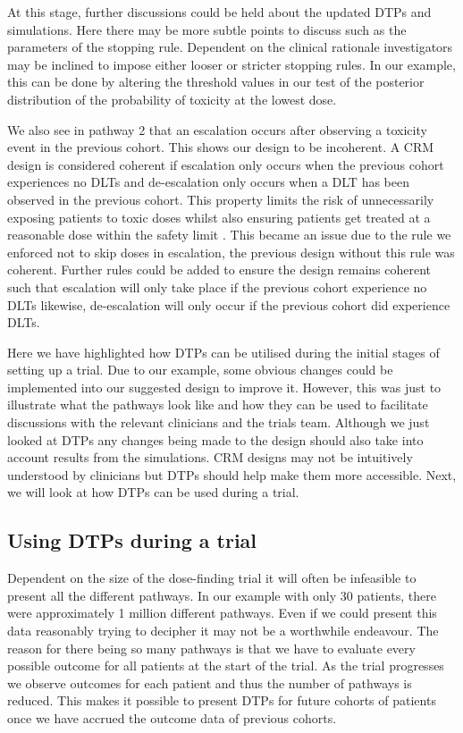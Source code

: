 At this stage, further discussions could be held about the updated DTPs and simulations. Here there may be more subtle points to discuss such as the parameters of the stopping rule. Dependent on the clinical rationale investigators may be inclined to impose either looser or stricter stopping rules. In our example, this can be done by altering the threshold values in our test of the posterior distribution of the probability of toxicity at the lowest dose. 

We also see in pathway 2 that an escalation occurs after observing a toxicity event in the previous cohort. This shows our design to be incoherent. A CRM design is considered coherent if escalation only occurs when the previous cohort experiences no DLTs and de-escalation only occurs when a DLT has been observed in the previous cohort. This property limits the risk of unnecessarily exposing patients to toxic doses whilst also ensuring patients get treated at a reasonable dose within the safety limit \cite{cheungDoseFindingContinual2011}. This became an issue due to the rule we enforced not to skip doses in escalation, the previous design without this rule was coherent. Further rules could be added to ensure the design remains coherent such that escalation will only take place if the previous cohort experience no DLTs likewise, de-escalation will only occur if the previous cohort did experience DLTs. 

Here we have highlighted how DTPs can be utilised during the initial stages of setting up a trial. Due to our example, some obvious changes could be implemented into our suggested design to improve it. However, this was just to illustrate what the pathways look like and how they can be used to facilitate discussions with the relevant clinicians and the trials team. Although we just looked at DTPs any changes being made to the design should also take into account results from the simulations. CRM designs may not be intuitively understood by clinicians but DTPs should help make them more accessible. Next, we will look at how DTPs can be used during a trial.  

\subsection{Using DTPs during a trial}

Dependent on the size of the dose-finding trial it will often be infeasible to present all the different pathways. In our example with only 30 patients, there were approximately 1 million different pathways. Even if we could present this data reasonably trying to decipher it may not be a worthwhile endeavour. The reason for there being so many pathways is that we have to evaluate every possible outcome for all patients at the start of the trial. As the trial progresses we observe outcomes for each patient and thus the number of pathways is reduced. This makes it possible to present DTPs for future cohorts of patients once we have accrued the outcome data of previous cohorts. 

